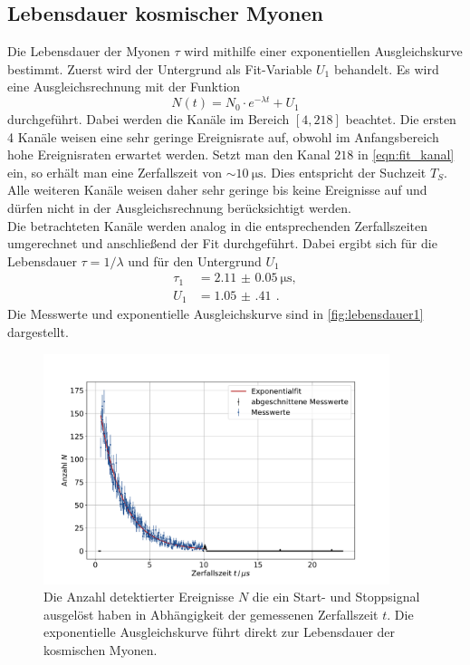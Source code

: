 \subsection{Lebensdauer kosmischer Myonen}
Die Lebensdauer der Myonen $\tau$ wird mithilfe einer exponentiellen Ausgleichskurve bestimmt.
Zuerst wird der Untergrund als Fit-Variable $U_1$ behandelt.
Es wird eine Ausgleichsrechnung mit der Funktion
\begin{equation}
    N(t) = N_0 \cdot e^{- \lambda t} + U_1
\end{equation}
durchgeführt.
Dabei werden die Kanäle im Bereich $[4, 218]$ beachtet.
Die ersten 4 Kanäle weisen eine sehr geringe Ereignisrate auf, obwohl im Anfangsbereich hohe Ereignisraten erwartet werden.
Setzt man den Kanal $218$ in \autoref{eqn:fit_kanal} ein, so erhält man eine Zerfallszeit von $\sim \qty{10}{\micro\second}$.
Dies entspricht der Suchzeit $T_S$.
Alle weiteren Kanäle weisen daher sehr geringe bis keine Ereignisse auf und dürfen nicht in der Ausgleichsrechnung berücksichtigt werden.
\\
Die betrachteten Kanäle werden analog in die entsprechenden Zerfallszeiten umgerechnet und anschließend der Fit durchgeführt.
Dabei ergibt sich für die Lebensdauer $\tau = 1/\lambda$ und für den Untergrund $U_1$
\begin{align}
    \tau_1 &= \qty{2.11(5)}{\micro\second},\\
    U_1 &= \qty{1.05(41)}{} \,.
\end{align}
Die Messwerte und exponentielle Ausgleichskurve sind in \autoref{fig:lebensdauer1} dargestellt.
\begin{figure}
    \centering
    \includegraphics[width=0.9\textwidth]{content/plots/lifetime.pdf}
    \caption{Die Anzahl detektierter Ereignisse $N$ die ein Start- und Stoppsignal ausgelöst haben in Abhängigkeit der gemessenen Zerfallszeit $t$.
    Die exponentielle Ausgleichskurve führt direkt zur Lebensdauer der kosmischen Myonen.
    }
    \label{fig:lebensdauer1}
\end{figure}
